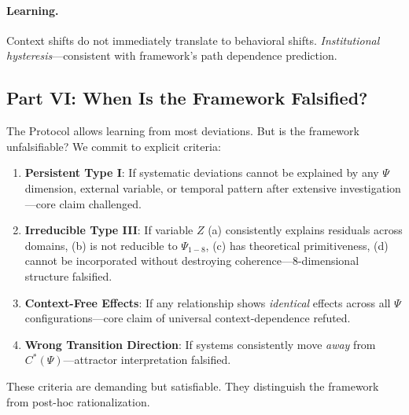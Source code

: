 \paragraph{Learning.}
Context shifts do not immediately translate to behavioral shifts. 
\textit{Institutional hysteresis}---consistent with framework's path dependence prediction.

\subsection{Part VI: When Is the Framework Falsified?}

The Protocol allows learning from most deviations. But is the framework 
unfalsifiable? We commit to explicit criteria:

\begin{enumerate}
    \item \textbf{Persistent Type I}: If systematic deviations cannot be explained 
          by any $\Psi$ dimension, external variable, or temporal pattern after 
          extensive investigation---core claim challenged.
    
    \item \textbf{Irreducible Type III}: If variable $Z$ (a) consistently explains 
          residuals across domains, (b) is not reducible to $\Psi_{1-8}$, 
          (c) has theoretical primitiveness, (d) cannot be incorporated without 
          destroying coherence---8-dimensional structure falsified.
    
    \item \textbf{Context-Free Effects}: If any relationship shows \textit{identical} 
          effects across all $\Psi$ configurations---core claim of universal 
          context-dependence refuted.
    
    \item \textbf{Wrong Transition Direction}: If systems consistently move 
          \textit{away} from $C^*(\Psi)$---attractor interpretation falsified.
\end{enumerate}

These criteria are demanding but satisfiable. They distinguish the framework 
from post-hoc rationalization.


